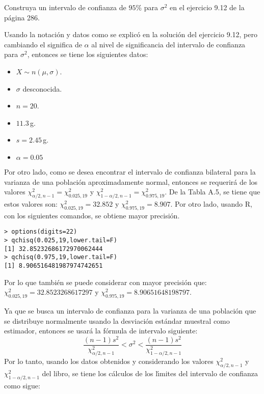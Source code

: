 \begin{enunciado}
 Construya un intervalo de confianza de $95\%$ para $\sigma^2$ en el ejercicio 9.12 de la p\'agina 286.
\end{enunciado}

\begin{solucion}
 Usando la notaci\'on y datos como se explic\'o en la soluci\'on del ejercicio 9.12, pero cambiando el significa de $\alpha$ al nivel de significancia del intervalo de confianza para $\sigma^2$, entonces se tiene los siguientes datos:
 \begin{itemize}
  \item $X \sim n(\mu, \sigma)$.
  \item $\sigma$ desconocida.
  \item $n = 20$.
  \item $11.3\,$g.
  \item $s=2.45\,$g.
  \item $\alpha = 0.05$
 \end{itemize}
 Por otro lado, como se desea encontrar el intervalo de confianza bilateral para la varianza de una poblaci\'on aproximadamente normal, entonces se requerir\'a de los valores $\chi^2_{\alpha/2,n-1} = \chi^2_{0.025,19}$ y $\chi^2_{1-\alpha/2,n-1} = \chi^2_{0.975,19}$. De la Tabla A.5, se tiene que estos valores son: $\chi^2_{0.025,19} = 32.852$ y $\chi^2_{0.975,19} = 8.907$. Por otro lado, usando R, con los siguientes comandos, se obtiene mayor precisi\'on.
 \begin{verbatim}
> options(digits=22)
> qchisq(0.025,19,lower.tail=F)
[1] 32.85232686172970062444
> qchisq(0.975,19,lower.tail=F)
[1] 8.906516481987974742651
 \end{verbatim}
 \vspace{-0.5cm}
 Por lo que tambi\'en se puede considerar con mayor precisi\'on que: $\chi^2_{0.025,19} = 32.8523268617297$ y $\chi^2_{0.975,19} = 8.90651648198797$.
 \par
 Ya que se busca un intervalo de confianza para la varianza de una poblaci\'on que se distribuye normalmente usando la desviaci\'on est\'andar muestral como estimador, entonces se usar\'a la f\'ormula de intervalo siguiente:
 \begin{equation*}
  \frac{(n-1)s^2}{\chi^2_{\alpha/2,n-1}} < \sigma^2 < \frac{(n-1)s^2}{\chi^2_{1-\alpha/2,n-1}}
 \end{equation*}
 Por lo tanto, usando los datos obtenidos y considerando los valores $\chi^2_{\alpha/2,n-1}$ y $\chi^2_{1-\alpha/2,n-1}$ del libro, se tiene los c\'alculos de los l\'{\i}mites del intervalo de confianza como sigue:

\end{solucion}
